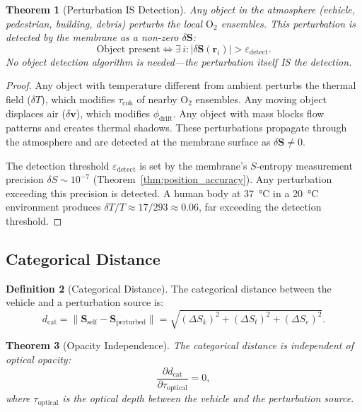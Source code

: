 \documentclass[12pt]{article}
\newtheorem{theorem}{Theorem}[section]
\theoremstyle{definition}
\newtheorem{definition}[theorem]{Definition}
\theoremstyle{remark}
\newcommand{\Sk}{S_k}
\newcommand{\St}{S_t}
\newcommand{\Se}{S_e}
\newcommand{\dcat}{d_{\mathrm{cat}}}
\begin{document}
\begin{theorem}[Perturbation IS Detection]
\label{thm:perturbation_detection}
Any object in the atmosphere (vehicle, pedestrian, building, debris) perturbs the local $\mathrm{O}_2$ ensembles. This perturbation is detected by the membrane as a non-zero $\delta\mathbf{S}$:
\begin{equation}
  \text{Object present} \iff \exists\, i : |\delta\mathbf{S}(\mathbf{r}_i)| > \varepsilon_{\mathrm{detect}}.
  \label{eq:detection}
\end{equation}
No object detection algorithm is needed---the perturbation itself IS the detection.
\end{theorem}

\begin{proof}
Any object with temperature different from ambient perturbs the thermal field ($\delta T$), which modifies $\tau_{\mathrm{coh}}$ of nearby $\mathrm{O}_2$ ensembles. Any moving object displaces air ($\delta \mathbf{v}$), which modifies $\phi_{\mathrm{drift}}$. Any object with mass blocks flow patterns and creates thermal shadows. These perturbations propagate through the atmosphere and are detected at the membrane surface as $\delta\mathbf{S} \neq 0$.

The detection threshold $\varepsilon_{\mathrm{detect}}$ is set by the membrane's $S$-entropy measurement precision $\delta S \sim 10^{-7}$ (Theorem~\ref{thm:position_accuracy}). Any perturbation exceeding this precision is detected. A human body at \SI{37}{\celsius} in a \SI{20}{\celsius} environment produces $\delta T / T \approx 17/293 \approx 0.06$, far exceeding the detection threshold.
\end{proof}

\subsection{Categorical Distance}

\begin{definition}[Categorical Distance]
\label{def:cat_distance}
The categorical distance between the vehicle and a perturbation source is:
\begin{equation}
  \dcat = \|\mathbf{S}_{\mathrm{self}} - \mathbf{S}_{\mathrm{perturbed}}\| = \sqrt{(\Delta\Sk)^2 + (\Delta\St)^2 + (\Delta\Se)^2}.
  \label{eq:cat_distance}
\end{equation}
\end{definition}

\begin{theorem}[Opacity Independence]
\label{thm:opacity}
The categorical distance is independent of optical opacity:
\begin{equation}
  \frac{\partial \dcat}{\partial \tau_{\mathrm{optical}}} = 0,
  \label{eq:opacity_independence}
\end{equation}
where $\tau_{\mathrm{optical}}$ is the optical depth between the vehicle and the perturbation source.
\end{theorem}
\end{document}
